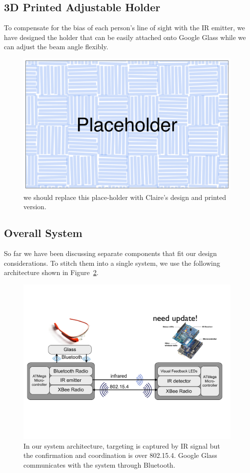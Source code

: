 \subsection{3D Printed Adjustable Holder}
\label{sec:3d-print-adjust}
To compensate for the bias of each person's line of sight with the IR emitter, we have designed the holder that can be easily attached onto Google Glass while we can adjust the beam angle flexibly.

\begin{figure}[t]
\centering
\includegraphics[width=0.9\columnwidth]{figures/placeholder.pdf}
\caption{we should replace this place-holder with Claire's design and printed version.}
\label{fig:3d-holder}
\end{figure}

\subsection{Overall System}
\label{sec:overall-system}
So far we have been discussing separate components that fit our design considerations. To stitch them into a single system, we use the following architecture shown in Figure~\ref{fig:architecture}.

\begin{figure}[t]
\centering
\includegraphics[width=0.9\columnwidth]{figures/architecture.pdf}
\caption{In our system architecture, targeting is captured by IR signal but the confirmation and coordination is over 802.15.4. Google Glass communicates with the system through Bluetooth.}
\label{fig:architecture}
\end{figure}

